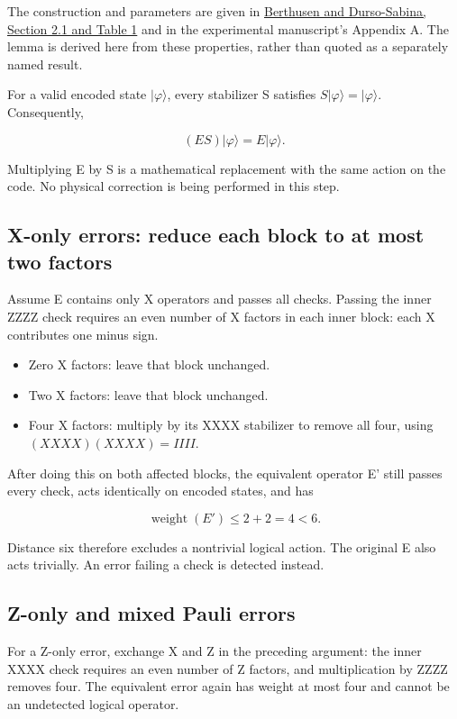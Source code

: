 \documentclass[11pt]{article}
\begin{document}
The construction and parameters are given in \href{https://quantum-journal.org/papers/q-2026-08-19-2195/pdf/}{Berthusen and Durso-Sabina, Section 2.1 and Table 1} and in the experimental manuscript's Appendix A. The lemma is derived here from these properties, rather than quoted as a separately named result.

For a valid encoded state \(|\varphi\rangle\), every stabilizer S satisfies \(S|\varphi\rangle=|\varphi\rangle\). Consequently,

\[
(ES)|\varphi\rangle=E|\varphi\rangle.
\]

Multiplying E by S is a mathematical replacement with the same action on the code. No physical correction is being performed in this step.

\subsection{X-only errors: reduce each block to at most two factors}
Assume E contains only X operators and passes all checks. Passing the inner ZZZZ check requires an even number of X factors in each inner block: each X contributes one minus sign.

\begin{itemize}\setlength\itemsep{1pt}
\item Zero X factors: leave that block unchanged.
\item Two X factors: leave that block unchanged.
\item Four X factors: multiply by its XXXX stabilizer to remove all four,
using \((XXXX)(XXXX)=IIII\).
\end{itemize}

After doing this on both affected blocks, the equivalent operator E' still passes every check, acts identically on encoded states, and has

\[
\operatorname{weight}(E')\le2+2=4<6.
\]

Distance six therefore excludes a nontrivial logical action. The original E also acts trivially. An error failing a check is detected instead.

\subsection{Z-only and mixed Pauli errors}
For a Z-only error, exchange X and Z in the preceding argument: the inner XXXX check requires an even number of Z factors, and multiplication by ZZZZ removes four. The equivalent error again has weight at most four and cannot be an undetected logical operator.
\end{document}
